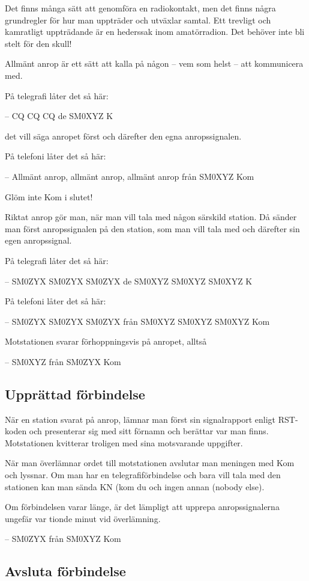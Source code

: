 Det finns många sätt att genomföra en radiokontakt, men det finns några
grundregler för hur man uppträder och utväxlar samtal.
Ett trevligt och kamratligt uppträdande är en hederssak inom amatörradion.
Det behöver inte bli stelt för den skull!

Allmänt anrop är ett sätt att kalla på någon
-- vem som helst -- att kommunicera med.

På telegrafi låter det så här:

-- CQ CQ CQ de SM0XYZ K

det vill säga anropet först och därefter den egna anropssignalen.

På telefoni låter det så här:

-- Allmänt anrop, allmänt anrop, allmänt anrop från SM0XYZ Kom

Glöm inte Kom i slutet!

Riktat anrop gör man, när man vill tala med någon särskild station.
Då sänder man först anropssignalen på den station, som man vill tala med och
därefter sin egen anropssignal.

På telegrafi låter det så här:

-- SM0ZYX SM0ZYX SM0ZYX de SM0XYZ SM0XYZ SM0XYZ K

På telefoni låter det så här:

-- SM0ZYX SM0ZYX SM0ZYX från SM0XYZ SM0XYZ SM0XYZ Kom

Motstationen svarar förhoppningsvis på anropet, alltså

-- SM0XYZ från SM0ZYX Kom

\subsection{Upprättad förbindelse}

När en station svarat på anrop, lämnar man först sin signalrapport
enligt RST-koden och presenterar sig med sitt förnamn och berättar var man finns.
Motstationen kvitterar troligen med sina motsvarande uppgifter.

När man överlämnar ordet till motstationen avslutar man meningen med Kom och lyssnar.
Om man har en telegrafiförbindelse och bara vill tala med den stationen kan man
sända KN (kom du och ingen annan (nobody else).

Om förbindelsen varar länge, är det lämpligt att upprepa anropssignalerna
ungefär var tionde minut vid överlämning.

-- SM0ZYX från SM0XYZ Kom

\subsection{Avsluta förbindelse}

